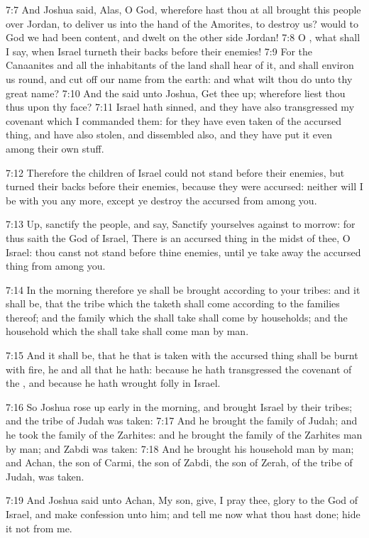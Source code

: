 7:7 And Joshua said, Alas, O \LORD God, wherefore hast thou at all
brought this people over Jordan, to deliver us into the hand of the
Amorites, to destroy us? would to God we had been content, and dwelt
on the other side Jordan!  7:8 O \LORD, what shall I say, when Israel
turneth their backs before their enemies!  7:9 For the Canaanites and
all the inhabitants of the land shall hear of it, and shall environ us
round, and cut off our name from the earth: and what wilt thou do unto
thy great name?  7:10 And the \LORD said unto Joshua, Get thee up;
wherefore liest thou thus upon thy face?  7:11 Israel hath sinned, and
they have also transgressed my covenant which I commanded them: for
they have even taken of the accursed thing, and have also stolen, and
dissembled also, and they have put it even among their own stuff.

7:12 Therefore the children of Israel could not stand before their
enemies, but turned their backs before their enemies, because they
were accursed: neither will I be with you any more, except ye destroy
the accursed from among you.

7:13 Up, sanctify the people, and say, Sanctify yourselves against to
morrow: for thus saith the \LORD God of Israel, There is an accursed
thing in the midst of thee, O Israel: thou canst not stand before
thine enemies, until ye take away the accursed thing from among you.

7:14 In the morning therefore ye shall be brought according to your
tribes: and it shall be, that the tribe which the \LORD taketh shall
come according to the families thereof; and the family which the \LORD
shall take shall come by households; and the household which the \LORD
shall take shall come man by man.

7:15 And it shall be, that he that is taken with the accursed thing
shall be burnt with fire, he and all that he hath: because he hath
transgressed the covenant of the \LORD, and because he hath wrought
folly in Israel.

7:16 So Joshua rose up early in the morning, and brought Israel by
their tribes; and the tribe of Judah was taken: 7:17 And he brought
the family of Judah; and he took the family of the Zarhites: and he
brought the family of the Zarhites man by man; and Zabdi was taken:
7:18 And he brought his household man by man; and Achan, the son of
Carmi, the son of Zabdi, the son of Zerah, of the tribe of Judah, was
taken.

7:19 And Joshua said unto Achan, My son, give, I pray thee, glory to
the \LORD God of Israel, and make confession unto him; and tell me now
what thou hast done; hide it not from me.

